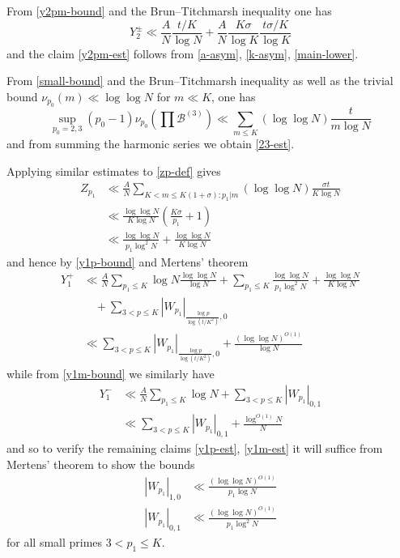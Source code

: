 \documentclass[12pt,a4paper,reqno]{amsart}
\numberwithin{equation}{section}
\theoremstyle{plain}
\theoremstyle{definition}
\newcommand\tuple{{\mathcal B}}
\begin{document}
From \eqref{y2pm-bound} and the Brun--Titchmarsh inequality one has 
$$
Y^\pm_2 \ll \frac{A}{N} \frac{t/K}{\log N} + \frac{A}{N} \frac{K\sigma}{\log K} \frac{t\sigma/K}{\log K}$$
and the claim \eqref{y2pm-est} follows from \eqref{a-asym}, \eqref{k-asym}, \eqref{main-lower}.

From \eqref{small-bound} and the Brun--Titchmarsh inequality as well as the trivial bound $\nu_{p_0}(m) \ll \log\log N$ for $m \ll K$, one has
$$
\sup_{p_0=2,3} (p_0-1) \nu_{p_0}\left(\prod \tuple^{(3)}\right) \ll \sum_{m \leq K} (\log\log N) \frac{t}{m \log N}$$
and from summing the harmonic series we obtain \eqref{23-est}.  

Applying similar estimates to \eqref{zp-def} gives
\begin{align*}
  Z_{p_1} &\ll
\frac{A}{N} \sum_{K < m \leq K(1+\sigma): p_1|m} (\log\log N) \frac{\sigma t}{K \log N} \\
&\ll \frac{\log\log N}{K\log N} (\frac{K\sigma}{p_1}+1) \\
&\ll \frac{\log\log N}{p_1 \log^2 N} + \frac{\log\log N}{K \log N}
\end{align*}
and hence by \eqref{y1p-bound} and Mertens' theorem
\begin{align*}
  Y_1^+ &\ll \frac{A}{N} \sum_{p_1 \leq K} \log N \frac{\log\log N}{\log N} + \sum_{p_1 \leq K} \frac{\log\log N}{p_1 \log^2 N} + \frac{\log\log N}{K \log N} \\
  &\quad + \sum_{3 < p \leq K}  |W_{p_1}|_{\frac{\log p}{\log (t/K^2)}, 0} \\
  &\ll \sum_{3 < p \leq K}  |W_{p_1}|_{\frac{\log p}{\log (t/K^2)}, 0} + \frac{(\log\log N)^{O(1)}}{\log N}
\end{align*}
while from \eqref{y1m-bound} we similarly have
\begin{align*} 
Y_1^- &\ll \frac{A}{N} \sum_{p_1 \leq K} \log N 
+ \sum_{3 < p \leq K}  |W_{p_1}|_{0, 1} \\
&\ll \sum_{3 < p \leq K}  |W_{p_1}|_{0, 1}  + \frac{\log^{O(1)} N}{N}
\end{align*}
and so to verify the remaining claims \eqref{y1p-est}, \eqref{y1m-est} it will suffice from Mertens' theorem to show the bounds
\begin{align}
  |W_{p_1}|_{1,0} &\ll \frac{(\log\log N)^{O(1)}}{p_1 \log N}\label{wp-plus}\\
  |W_{p_1}|_{0,1} &\ll \frac{(\log\log N)^{O(1)}}{p_1 \log^2 N}\label{wp-minus}
\end{align}
for all small primes $3 < p_1 \leq K$.
\end{document}
